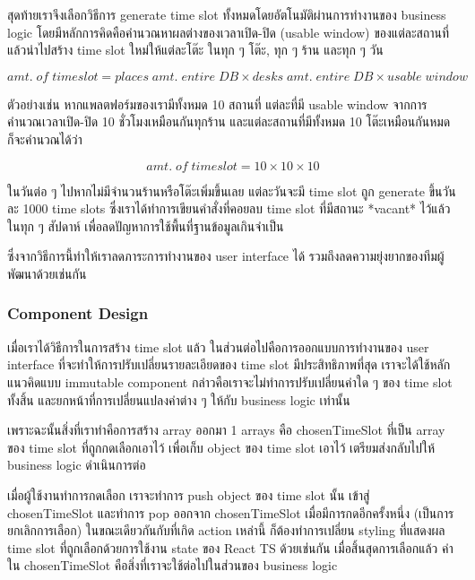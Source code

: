สุดท้ายเราจึงเลือกวิธีการ generate time slot ทั้งหมดโดยอัตโนมัติผ่านการทำงานของ business logic โดยมีหลักการคิดคือคำนวณหาผลต่างของเวลาเปิด-ปิด (usable window) ของแต่ละสถานที่ แล้วนำไปสร้าง time slot ใหม่ให้แต่ละโต๊ะ ในทุก ๆ โต๊ะ, ทุก ๆ ร้าน และทุก ๆ วัน

\begin{equation}
    amt.\;of\;timeslot = places\;amt.\;entire\;DB\times desks\;amt.\;entire\;DB \times usable\;window
\end{equation}

ตัวอย่างเช่น หากแพลตฟอร์มของเรามีทั้งหมด 10 สถานที่ แต่ละที่มี usable window จากการคำนวณเวลาเปิด-ปิด 10 ชั่วโมงเหมือนกันทุกร้าน และแต่ละสถานที่มีทั้งหมด 10 โต๊ะเหมือนกันหมด ก็จะคำนวณได้ว่า

\begin{equation}
    amt.\;of\;timeslot = 10 \times 10 \times 10
\end{equation}

ในวันต่อ ๆ ไปหากไม่มีจำนวนร้านหรือโต๊ะเพิ่มขึ้นเลย แต่ละวันจะมี time slot ถูก generate ขึ้นวันละ 1000 time slots ซึ่งเราได้ทำการเขียนคำสั่งที่คอยลบ time slot ที่มีสถานะ *vacant* ไว้แล้วในทุก ๆ สัปดาห์ เพื่อลดปัญหาการใช้พื้นที่ฐานข้อมูลเกินจำเป็น

ซึ่งจากวิธีการนี้ทำให้เราลดภาระการทำงานของ user interface ได้ รวมถึงลดความยุ่งยากของทีมผู้พัฒนาด้วยเช่นกัน

\subsubsection{Component Design}
เมื่อเราได้วิธีการในการสร้าง time slot แล้ว ในส่วนต่อไปคือการออกแบบการทำงานของ user interface ที่จะทำให้การปรับเปลี่ยนรายละเอียดของ time slot มีประสิทธิภาพที่สุด เราจะได้ใช้หลักแนวคิดแบบ immutable component กล่าวคือเราจะไม่ทำการปรับเปลี่ยนค่าใด ๆ ของ time slot ทั้งสิ้น และยกหน้าที่การเปลี่ยนแปลงค่าต่าง ๆ ให้กับ business logic เท่านั้น

เพราะฉะนั้นสิ่งที่เราทำคือการสร้าง array ออกมา 1 arrays คือ chosenTimeSlot ที่เป็น array ของ time slot ที่ถูกกดเลือกเอาไว้ เพื่อเก็บ object ของ time slot เอาไว้ เตรียมส่งกลับไปให้ business logic ดำเนินการต่อ

เมื่อผู้ใช้งานทำการกดเลือก เราจะทำการ push object ของ time slot นั้น เข้าสู่ chosenTimeSlot และทำการ pop ออกจาก chosenTimeSlot เมื่อมีการกดอีกครั้งหนึ่ง (เป็นการยกเลิกการเลือก) ในขณะเดียวกันกับที่เกิด action เหล่านี้ ก็ต้องทำการเปลี่ยน styling ที่แสดงผล time slot ที่ถูกเลือกด้วยการใช้งาน state ของ React TS ด้วยเช่นกัน เมื่อสิ้นสุดการเลือกแล้ว ค่าใน chosenTimeSlot คือสิ่งที่เราจะใช้ต่อไปในส่วนของ business logic

